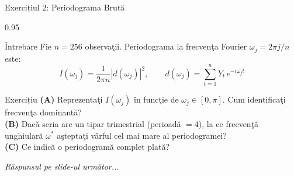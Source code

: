 \documentclass[9pt, aspectratio=169, t]{beamer}
\begin{document}
\begin{frame}{Exercițiul 2: Periodograma Brută}
    \begin{cminipage}{0.95\textwidth}
    \begin{alertblock}{Întrebare}
        Fie $n = 256$ observaţii. Periodograma la frecvenţa Fourier $\omega_j = 2\pi j/n$ este:
        \[
            I(\omega_j) = \frac{1}{2\pi n}\left|d(\omega_j)\right|^2, \qquad
            d(\omega_j) = \sum_{t=1}^{n} Y_t\, e^{-i\omega_j t}
        \]
    \end{alertblock}

    \vspace{0.15cm}

    \begin{block}{Exercițiu}
        \textcolor{MainBlue}{\textbf{(A)}} Reprezentaţi $I(\omega_j)$ în funcţie de $\omega_j \in [0, \pi]$. Cum identificaţi frecvenţa dominantă?\\[3pt]
        \textcolor{MainBlue}{\textbf{(B)}} Dacă seria are un tipar trimestrial (perioadă $= 4$), la ce frecvenţă unghiulară $\omega^*$ aşteptaţi vârful cel mai mare al periodogramei?\\[3pt]
        \textcolor{MainBlue}{\textbf{(C)}} Ce indică o periodogramă complet plată?
    \end{block}

    \vspace{0.15cm}

    \begin{center}
        \textit{Răspunsul pe slide-ul următor...}
    \end{center}
    \end{cminipage}
\end{frame}
\end{document}
